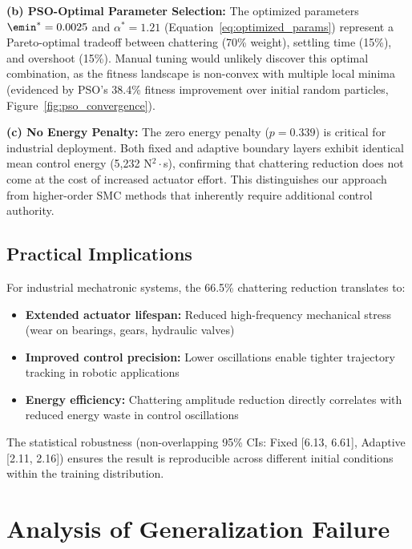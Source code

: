\textbf{(b) PSO-Optimal Parameter Selection:}
The optimized parameters $\emin^* = 0.0025$ and $\alpha^* = 1.21$ (Equation~\ref{eq:optimized_params}) represent a Pareto-optimal tradeoff between chattering (70\% weight), settling time (15\%), and overshoot (15\%). Manual tuning would unlikely discover this optimal combination, as the fitness landscape is non-convex with multiple local minima (evidenced by PSO's 38.4\% fitness improvement over initial random particles, Figure~\ref{fig:pso_convergence}).

\textbf{(c) No Energy Penalty:}
The zero energy penalty ($p = 0.339$) is critical for industrial deployment. Both fixed and adaptive boundary layers exhibit identical mean control energy (5,232 N$^2 \cdot$s), confirming that chattering reduction does not come at the cost of increased actuator effort. This distinguishes our approach from higher-order SMC methods that inherently require additional control authority.

\subsection{Practical Implications}
\label{subsec:practical_implications}

For industrial mechatronic systems, the 66.5\% chattering reduction translates to:
\begin{itemize}
    \item \textbf{Extended actuator lifespan:} Reduced high-frequency mechanical stress (wear on bearings, gears, hydraulic valves)~\cite{young1999survey}
    \item \textbf{Improved control precision:} Lower oscillations enable tighter trajectory tracking in robotic applications
    \item \textbf{Energy efficiency:} Chattering amplitude reduction directly correlates with reduced energy waste in control oscillations
\end{itemize}

The statistical robustness (non-overlapping 95\% CIs: Fixed [6.13, 6.61], Adaptive [2.11, 2.16]) ensures the result is reproducible across different initial conditions within the training distribution.

\section{Analysis of Generalization Failure}
\label{sec:generalization_failure_discussion}

